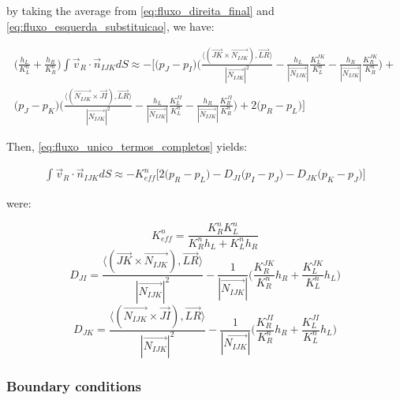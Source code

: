 \documentclass{article}
\begin{document}
by taking the average from \ref{eq:fluxo_direita_final} and \ref{eq:fluxo_esquerda_substituicao}, we have:

\begin{equation} \label{eq:fluxo_unico_termos_completos}
\begin{split}
\Bigg(\frac{h_{L}}{K^n_{L}} + \frac{h_{R}}{K^n_{R}} \Bigg)\int{\vec{v}_{R} \cdot \vec{n}_{IJK}dS} 
 \approx -\Bigg[ \big( p_{J} - p_{I} \big) \Bigg( \frac{\langle(\vec{JK} \times \vec{N_{IJK}}), \vec{LR}\rangle}{|\vec{N_{IJK}}| ^2} - \frac{h_{L}}{|\vec{N_{IJK}}|}\frac{K^{JK}_{L}}{K^n_{L}} - \frac{h_{R}}{|\vec{N_{IJK}}|}\frac{K^{JK}_{R}}{K^{n}_{R}}\Bigg) + \\
\big( p_{J} - p_{K} \big) \Bigg(\frac{\langle(\vec{N_{IJK}} \times \vec{JI}), \vec{LR}\rangle}{|\vec{N_{IJK}}| ^2}  - \frac{h_{L}}{|\vec{N_{IJK}}|} \frac{K^{JI}_{L}}{K^n_{L}} - \frac{h_{R}}{|\vec{N_{IJK}}|}\frac{K^{JI}_{R}}{K^n_{R}}\Bigg) + 2\big( p_{R} - p_{L}\big)\Bigg]
\end{split}
\end{equation}

Then, \ref{eq:fluxo_unico_termos_completos} yields:

\begin{equation} \label{eq:fluxo_unico_final}
\begin{split}
\int{\vec{v}_{R} \cdot \vec{n}_{IJK}dS} 
 \approx -K^n_{eff}\Bigg[ 2 \big(p_{R} - p_{L}\big) -D_{JI}\big( p_{I} - p_{J}\big) - D_{JK}\big( p_{K} - p_{J}\big)\Bigg]
\end{split}
\end{equation}

were:

\begin{equation}
K^n_{eff} = \frac{K^n_{R}K^n_{L}}{K^n_{R}h_{L} + K^n_{L}h_{R}}
\end{equation}
\begin{equation}
D_{JI} = \frac{\langle(\vec{JK} \times \vec{N_{IJK}}), \vec{LR}\rangle}{|\vec{N_{IJK}}| ^2} - \frac{1}{|\vec{N_{IJK}}|}\Bigg(\frac{K^{JK}_{R}}{K^{n}_{R}}h_{R}+\frac{K^{JK}_{L}}{K^n_{L}}h_{L} \Bigg)
\end{equation}
\begin{equation}
D_{JK} = \frac{\langle(\vec{N_{IJK}} \times \vec{JI}), \vec{LR}\rangle}{|\vec{N_{IJK}}| ^2}  - \frac{1}{|\vec{N_{IJK}}|}\Bigg(\frac{K^{JI}_{R}}{K^{n}_{R}}h_{R}+\frac{K^{JI}_{L}}{K^n_{L}}h_{L} \Bigg)
\end{equation}
		\subsubsection{Boundary conditions}
\end{document}
